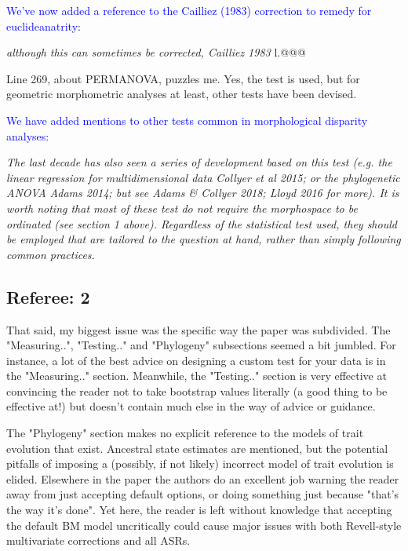 \documentclass[12pt,letterpaper]{article}
\begin{document}
\textcolor{blue}{We've now added a reference to the Cailliez (1983) correction to remedy for euclideanatrity}:

\textit{although this can sometimes be corrected, Cailliez 1983} l.@@@

Line 269, about PERMANOVA, puzzles me. Yes, the test is used, but for geometric morphometric analyses at least, other tests have been devised.

\textcolor{blue}{We have added mentions to other tests common in morphological disparity analyses:}

\textit{The last decade has also seen a series of development based on this test (e.g. the linear regression for multidimensional data Collyer et al 2015; or the phylogenetic ANOVA Adams 2014; but see Adams \& Collyer 2018; Lloyd 2016 for more).
It is worth noting that most of these test do not require the morphospace to be ordinated (see section 1 above).
Regardless of the statistical test used, they should be employed that are tailored to the question at hand, rather than simply following common practices.}

\subsection{Referee: 2}

That said, my biggest issue was the specific way the paper was subdivided. The "Measuring..", "Testing.." and "Phylogeny" subsections seemed a bit jumbled. For instance, a lot of the best advice on designing a custom test for your data is in the "Measuring.." section. Meanwhile, the "Testing.." section is very effective at convincing the reader not to take bootstrap values literally (a good thing to be effective at!) but doesn't contain much else in the way of advice or guidance.


The "Phylogeny" section makes no explicit reference to the models of trait evolution that exist. Ancestral state estimates are mentioned, but the potential pitfalls of imposing a (possibly, if not likely) incorrect model of trait evolution is elided. Elsewhere in the paper the authors do an excellent job warning the reader away from just accepting default options, or doing something just because "that's the way it's done". Yet here, the reader is left without knowledge that accepting the default BM model uncritically could cause major issues with both Revell-style multivariate corrections and all ASRs.
\end{document}
